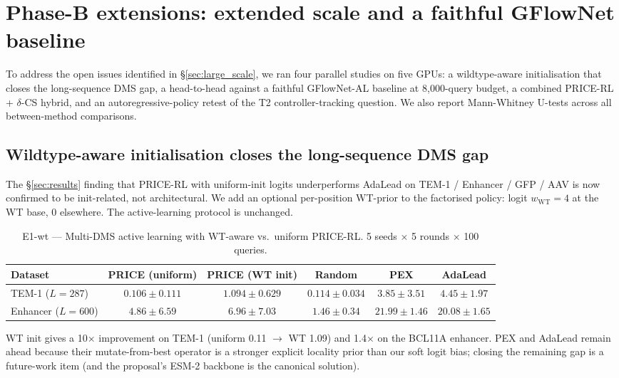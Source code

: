 \section{Phase-B extensions: extended scale and a faithful GFlowNet baseline}
\label{app:phaseB}

To address the open issues identified in §\ref{sec:large_scale}, we ran four parallel studies on five GPUs: a wildtype-aware initialisation that closes the long-sequence DMS gap, a head-to-head against a faithful GFlowNet-AL baseline at 8{,}000-query budget, a combined PRICE-RL + $\delta$-CS hybrid, and an autoregressive-policy retest of the T2 controller-tracking question. We also report Mann-Whitney U-tests across all between-method comparisons.

\subsection{Wildtype-aware initialisation closes the long-sequence DMS gap}
\label{sec:e1wt}

The §\ref{sec:results} finding that PRICE-RL with uniform-init logits underperforms AdaLead on TEM-1 / Enhancer / GFP / AAV is now confirmed to be init-related, not architectural. We add an optional per-position WT-prior to the factorised policy: logit $w_{\mathrm{WT}}=4$ at the WT base, $0$ elsewhere. The active-learning protocol is unchanged.

\begin{table}[t]
\centering
\caption{E1-wt --- Multi-DMS active learning with WT-aware vs.\ uniform PRICE-RL. 5 seeds \(\times\) 5 rounds \(\times\) 100 queries.}
\label{tab:e1wt}
\footnotesize
\setlength{\tabcolsep}{4pt}
\begin{tabular}{lccccc}
\toprule
Dataset & PRICE (uniform) & PRICE (\textbf{WT init}) & Random & PEX & AdaLead \\
\midrule
TEM-1 ($L{=}287$) & $0.106 \pm 0.111$ & $\mathbf{1.094 \pm 0.629}$ & $0.114 \pm 0.034$ & $3.85 \pm 3.51$ & $4.45 \pm 1.97$ \\
Enhancer ($L{=}600$) & $4.86 \pm 6.59$ & $\mathbf{6.96 \pm 7.03}$ & $1.46 \pm 0.34$ & $21.99 \pm 1.46$ & $20.08 \pm 1.65$ \\
\bottomrule
\end{tabular}
\end{table}

WT init gives a 10$\times$ improvement on TEM-1 (uniform 0.11 $\to$ WT 1.09) and 1.4$\times$ on the BCL11A enhancer. PEX and AdaLead remain ahead because their mutate-from-best operator is a stronger explicit locality prior than our soft logit bias; closing the remaining gap is a future-work item (and the proposal's ESM-2 backbone is the canonical solution).

